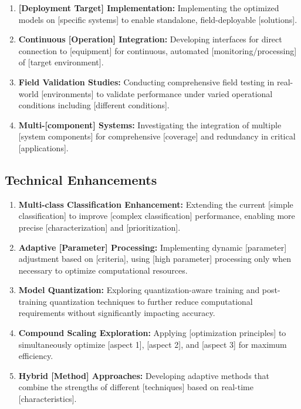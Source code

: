 \begin{enumerate}
\item \textbf{[Deployment Target] Implementation:} Implementing the optimized models on [specific systems] to enable standalone, field-deployable [solutions].

\item \textbf{Continuous [Operation] Integration:} Developing interfaces for direct connection to [equipment] for continuous, automated [monitoring/processing] of [target environment].

\item \textbf{Field Validation Studies:} Conducting comprehensive field testing in real-world [environments] to validate performance under varied operational conditions including [different conditions].

\item \textbf{Multi-[component] Systems:} Investigating the integration of multiple [system components] for comprehensive [coverage] and redundancy in critical [applications].
\end{enumerate}

\subsection{Technical Enhancements}

\begin{enumerate}
\item \textbf{Multi-class Classification Enhancement:} Extending the current [simple classification] to improve [complex classification] performance, enabling more precise [characterization] and [prioritization].

\item \textbf{Adaptive [Parameter] Processing:} Implementing dynamic [parameter] adjustment based on [criteria], using [high parameter] processing only when necessary to optimize computational resources.

\item \textbf{Model Quantization:} Exploring quantization-aware training and post-training quantization techniques to further reduce computational requirements without significantly impacting accuracy.

\item \textbf{Compound Scaling Exploration:} Applying [optimization principles] to simultaneously optimize [aspect 1], [aspect 2], and [aspect 3] for maximum efficiency.

\item \textbf{Hybrid [Method] Approaches:} Developing adaptive methods that combine the strengths of different [techniques] based on real-time [characteristics].
\end{enumerate}

